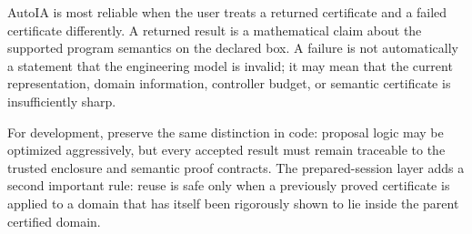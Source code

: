 \documentclass[11pt]{article}
\begin{document}
AutoIA is most reliable when the user treats a returned certificate and a failed
certificate differently.  A returned result is a mathematical claim about the
supported program semantics on the declared box.  A failure is not automatically
a statement that the engineering model is invalid; it may mean that the current
representation, domain information, controller budget, or semantic certificate
is insufficiently sharp.

For development, preserve the same distinction in code: proposal logic may be
optimized aggressively, but every accepted result must remain traceable to the
trusted enclosure and semantic proof contracts.  The prepared-session layer adds
a second important rule: reuse is safe only when a previously proved certificate
is applied to a domain that has itself been rigorously shown to lie inside the
parent certified domain.
\end{document}
